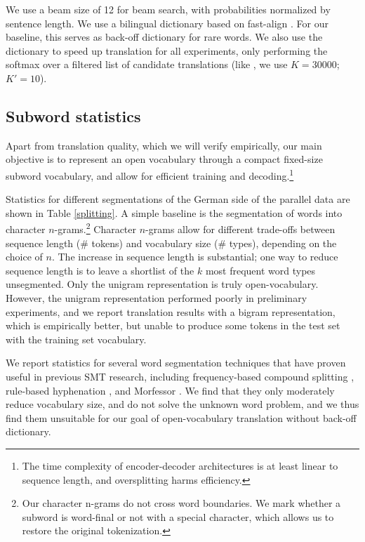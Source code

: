 \documentclass[11pt]{article}
\begin{document}
We use a beam size of 12 for beam search, with probabilities normalized by sentence length.
We use a bilingual dictionary based on fast-align \cite{dyer-chahuneau-smith:2013:NAACL-HLT}.
For our baseline, this serves as back-off dictionary for rare words.
We also use the dictionary to speed up translation for all experiments, only performing the softmax over a filtered list of candidate translations (like , we use $K=30000$; $K'=10$).


\subsection{Subword statistics}

Apart from translation quality, which we will verify empirically, our main objective is to represent an open vocabulary through a compact fixed-size subword vocabulary, and allow for efficient training and decoding.\footnote{The time complexity of encoder-decoder architectures is at least linear to sequence length, and oversplitting harms efficiency.}

Statistics for different segmentations of the German side of the parallel data are shown in Table \ref{splitting}.
A simple baseline is the segmentation of words into character $n$-grams.\footnote{Our character n-grams do not cross word boundaries. We mark whether a subword is word-final or not with a special character, which allows us to restore the original tokenization.}
Character $n$-grams allow for different trade-offs between sequence length (\# tokens) and vocabulary size (\# types), depending on the choice of $n$.
The increase in sequence length is substantial; one way to reduce sequence length is to leave a shortlist of the $k$ most frequent word types unsegmented.
Only the unigram representation is truly open-vocabulary.
However, the unigram representation performed poorly in preliminary experiments, and we report translation results with a bigram representation, which is empirically better, but unable to produce some tokens in the test set with the training set vocabulary.

We report statistics for several word segmentation techniques that have proven useful in previous SMT research, including
frequency-based compound splitting \cite{koehn03b}, rule-based hyphenation \cite{Liang:151530}, and Morfessor \cite{creutz-lagus:2002:ACL02-MPL}.
We find that they only moderately reduce vocabulary size, and do not solve the unknown word problem, and we thus find them unsuitable for our goal of open-vocabulary translation without back-off dictionary.
\end{document}
